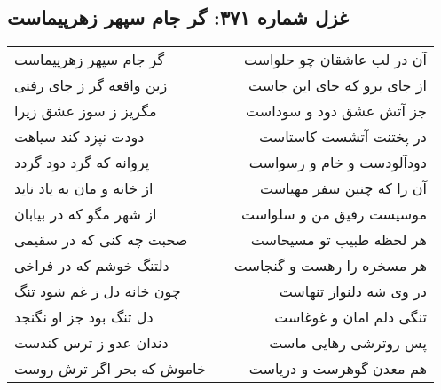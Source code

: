 \begin{center}
\section*{غزل شماره ۳۷۱: گر جام سپهر زهرپیماست}
\label{sec:0371}
\begin{longtable}{l p{0.5cm} r}
گر جام سپهر زهرپیماست
&&
آن در لب عاشقان چو حلواست
\\
زین واقعه گر ز جای رفتی
&&
از جای برو که جای این جاست
\\
مگریز ز سوز عشق زیرا
&&
جز آتش عشق دود و سوداست
\\
دودت نپزد کند سیاهت
&&
در پختنت آتشست کاستاست
\\
پروانه که گرد دود گردد
&&
دودآلودست و خام و رسواست
\\
از خانه و مان به یاد ناید
&&
آن را که چنین سفر مهیاست
\\
از شهر مگو که در بیابان
&&
موسیست رفیق من و سلواست
\\
صحبت چه کنی که در سقیمی
&&
هر لحظه طبیب تو مسیحاست
\\
دلتنگ خوشم که در فراخی
&&
هر مسخره را رهست و گنجاست
\\
چون خانه دل ز غم شود تنگ
&&
در وی شه دلنواز تنهاست
\\
دل تنگ بود جز او نگنجد
&&
تنگی دلم امان و غوغاست
\\
دندان عدو ز ترس کندست
&&
پس روترشی رهایی ماست
\\
خاموش که بحر اگر ترش روست
&&
هم معدن گوهرست و دریاست
\\
\end{longtable}
\end{center}
